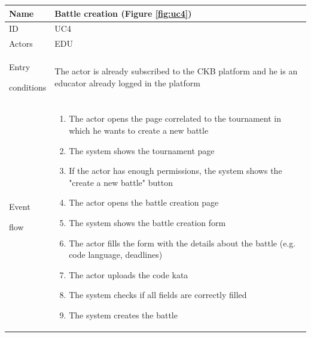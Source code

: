 \begin{center}
    \def\arraystretch{1.5}
    \begin{tabular}{| m{2cm} | m{10cm}|}
        \hline
        Name                  & Battle creation  (Figure \ref{fig:uc4})                                                                                         \\ \hline
        ID                    & UC4                                                                                                                             \\ \hline
        Actors                & EDU                                                                                                                             \\ \hline
        Entry \par conditions & The actor is already subscribed to the CKB platform and he is an educator already logged in the platform                        \\ \hline
        Event \par flow       & \begin{enumerate}
                                    \item The actor opens the page correlated to the tournament in which he wants to create a new battle
                                    \item The system shows the tournament page
                                    \item If the actor has enough permissions, the system shows the "create a new battle" button
                                    \item The actor opens the battle creation page
                                    \item The system shows the battle creation form
                                    \item The actor fills the form with the details about the battle (e.g. code language, deadlines)
                                    \item The actor uploads the code kata
                                    \item The system checks if all fields are correctly filled
                                    \item The system creates the battle
                                \end{enumerate}                             \\ \hline

\end{tabular}
\end{center}
